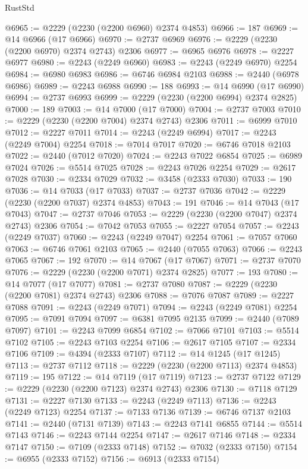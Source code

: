 \begin{lexlean}{RustStd}
\begin{coremodule}
{\begin{coremodule}
{{{{{{{{{{{{{{{{{{{{{{{{{{{{{{{{{{@6965 := @2229 (@2230 (@2200 @6960) @2374 @4853)
@6966 := 187
@6969 := @14 @6966 (@17 @6966)
@6970 := @2737 @6969
@6976 := @2229 (@2230 (@2200 @6970) @2374 @2743) @2306
@6977 := @6965 @6976
@6978 := @2227 @6977
@6980 := @2243 (@2249 @6960)
@6983 := @2243 (@2249 @6970) @2254
@6984 := @6980 @6983
@6986 := @6746 @6984 @2103
@6988 := @2440 (@6978 @6986)
@6989 := @2243 @6988
@6990 := 188
@6993 := @14 @6990 (@17 @6990)
@6994 := @2737 @6993
@6999 := @2229 (@2230 (@2200 @6994) @2374 @2825)
@7000 := 189
@7003 := @14 @7000 (@17 @7000)
@7004 := @2737 @7003
@7010 := @2229 (@2230 (@2200 @7004) @2374 @2743) @2306
@7011 := @6999 @7010
@7012 := @2227 @7011
@7014 := @2243 (@2249 @6994)
@7017 := @2243 (@2249 @7004) @2254
@7018 := @7014 @7017
@7020 := @6746 @7018 @2103
@7022 := @2440 (@7012 @7020)
@7024 := @2243 @7022 @6854
@7025 := @6989 @7024
@7026 := @5514 @7025
@7028 := @2243 @7026 @2254
@7029 := @2617 @7028
@7030 := @2334 @7029
@7032 := @3458 (@2333 @7030)
@7033 := 190
@7036 := @14 @7033 (@17 @7033)
@7037 := @2737 @7036
@7042 := @2229 (@2230 (@2200 @7037) @2374 @4853)
@7043 := 191
@7046 := @14 @7043 (@17 @7043)
@7047 := @2737 @7046
@7053 := @2229 (@2230 (@2200 @7047) @2374 @2743) @2306
@7054 := @7042 @7053
@7055 := @2227 @7054
@7057 := @2243 (@2249 @7037)
@7060 := @2243 (@2249 @7047) @2254
@7061 := @7057 @7060
@7063 := @6746 @7061 @2103
@7065 := @2440 (@7055 @7063)
@7066 := @2243 @7065
@7067 := 192
@7070 := @14 @7067 (@17 @7067)
@7071 := @2737 @7070
@7076 := @2229 (@2230 (@2200 @7071) @2374 @2825)
@7077 := 193
@7080 := @14 @7077 (@17 @7077)
@7081 := @2737 @7080
@7087 := @2229 (@2230 (@2200 @7081) @2374 @2743) @2306
@7088 := @7076 @7087
@7089 := @2227 @7088
@7091 := @2243 (@2249 @7071)
@7094 := @2243 (@2249 @7081) @2254
@7095 := @7091 @7094
@7097 := @6381 @7095 @2135
@7099 := @2440 (@7089 @7097)
@7101 := @2243 @7099 @6854
@7102 := @7066 @7101
@7103 := @5514 @7102
@7105 := @2243 @7103 @2254
@7106 := @2617 @7105
@7107 := @2334 @7106
@7109 := @4394 (@2333 @7107)
@7112 := @14 @1245 (@17 @1245)
@7113 := @2737 @7112
@7118 := @2229 (@2230 (@2200 @7113) @2374 @4853)
@7119 := 195
@7122 := @14 @7119 (@17 @7119)
@7123 := @2737 @7122
@7129 := @2229 (@2230 (@2200 @7123) @2374 @2743) @2306
@7130 := @7118 @7129
@7131 := @2227 @7130
@7133 := @2243 (@2249 @7113)
@7136 := @2243 (@2249 @7123) @2254
@7137 := @7133 @7136
@7139 := @6746 @7137 @2103
@7141 := @2440 (@7131 @7139)
@7143 := @2243 @7141 @6855
@7144 := @5514 @7143
@7146 := @2243 @7144 @2254
@7147 := @2617 @7146
@7148 := @2334 @7147
@7150 := @7109 (@2333 @7148)
@7152 := @7032 (@2333 @7150)
@7154 := @6955 (@2333 @7152)
@7156 := @6913 (@2333 @7154)
}}}}}}}}}}}}}}}}}}}}}}}}}}}}}}}}}}
\end{coremodule}}
\end{coremodule}
\end{lexlean}
